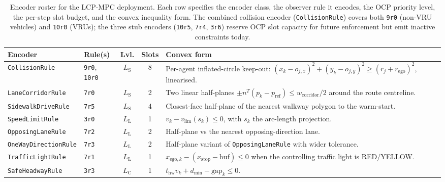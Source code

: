 \begin{table}[h]
    \centering
    \caption{Encoder roster for the LCP-MPC deployment. Each row specifies the encoder class, the observer rule it encodes, the OCP priority level, the per-step slot budget, and the convex inequality form. The combined collision encoder (\texttt{CollisionRule}) covers both \texttt{9r0} (non-VRU vehicles) and \texttt{10r0} (VRUs); the three stub encoders (\texttt{10r5}, \texttt{7r4}, \texttt{3r6}) reserve OCP slot capacity for future enforcement but emit inactive constraints today.}
    \label{tab:encoder_spec}
    \footnotesize
    \begin{tabularx}{\linewidth}{@{}l l c c X@{}}
        \toprule
        Encoder & Rule(s) & Lvl. & Slots & Convex form \\
        \midrule
        \texttt{CollisionRule}            & \texttt{9r0}, \texttt{10r0} & $L_{\mathrm{S}}$ & 8 & Per-agent inflated-circle keep-out: $(x_k - o_{j,x})^{2} + (y_k - o_{j,y})^{2} \geq (r_{j} + r_{\mathrm{ego}})^{2}$, linearised. \\
        \texttt{LaneCorridorRule}         & \texttt{7r0}                & $L_{\mathrm{S}}$ & 2 & Two linear half-planes $\pm n^{T}(p_{k} - p_{\mathrm{ref}}) \leq w_{\mathrm{corridor}}/2$ around the route centreline. \\
        \texttt{SidewalkDriveRule}        & \texttt{7r5}                & $L_{\mathrm{S}}$ & 4 & Closest-face half-plane of the nearest walkway polygon to the warm-start. \\
        \midrule
        \texttt{SpeedLimitRule}           & \texttt{3r0}                & $L_{\mathrm{L}}$ & 1 & $v_{k} - v_{\lim}(s_{k}) \leq 0$, with $s_{k}$ the arc-length projection. \\
        \texttt{OpposingLaneRule}         & \texttt{7r2}                & $L_{\mathrm{L}}$ & 2 & Half-plane vs the nearest opposing-direction lane. \\
        \texttt{OneWayDirectionRule}      & \texttt{7r3}                & $L_{\mathrm{L}}$ & 2 & Half-plane variant of \texttt{OpposingLaneRule} with wider tolerance. \\
        \texttt{TrafficLightRule}         & \texttt{7r1}                & $L_{\mathrm{L}}$ & 1 & $x_{\mathrm{ego}, k} - (x_{\mathrm{stop}} - \mathrm{buf}) \leq 0$ when the controlling traffic light is RED/YELLOW. \\
        \midrule
        \texttt{SafeHeadwayRule}          & \texttt{3r3}                & $L_{\mathrm{C}}$ & 1 & $t_{\mathrm{hw}} v_{k} + d_{\min} - \mathrm{gap}_{k} \leq 0$. \\

\end{tabularx}
\end{table}
